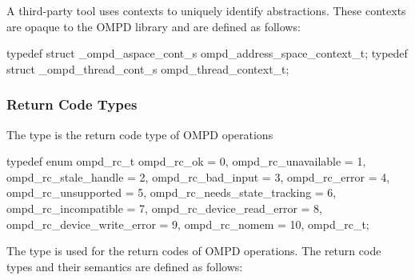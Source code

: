 \summary
A third-party tool uses contexts to uniquely identify abstractions. These 
contexts are opaque to the OMPD library and are defined as follows:

\format
\begin{ccppspecific}
\begin{ompSyntax}
typedef struct _ompd_aspace_cont_s ompd_address_space_context_t;
typedef struct _ompd_thread_cont_s ompd_thread_context_t;
\end{ompSyntax}
\end{ccppspecific}



\subsubsection{Return Code Types}
\label{subsubsec:ompd_rc_t}

\summary
The  type is the return code type of OMPD operations

\format
\begin{ccppspecific}
\begin{ompSyntax}
typedef enum ompd_rc_t {
  ompd_rc_ok = 0,
  ompd_rc_unavailable = 1,
  ompd_rc_stale_handle = 2,
  ompd_rc_bad_input = 3,
  ompd_rc_error = 4,
  ompd_rc_unsupported = 5,
  ompd_rc_needs_state_tracking = 6,
  ompd_rc_incompatible = 7,
  ompd_rc_device_read_error = 8,
  ompd_rc_device_write_error = 9,
  ompd_rc_nomem = 10,
} ompd_rc_t;
\end{ompSyntax}
\end{ccppspecific}


\descr
The  type is used for the return codes of OMPD operations. 
The return code types and their semantics are defined as follows:

